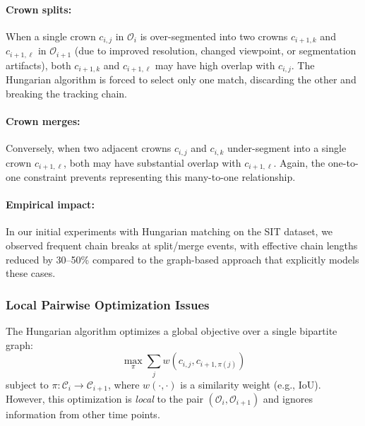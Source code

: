 \paragraph{Crown splits:} When a single crown $c_{i,j}$ in $\mathcal{O}_i$ is over-segmented into two crowns $c_{i+1,k}$ and $c_{i+1,\ell}$ in $\mathcal{O}_{i+1}$ (due to improved resolution, changed viewpoint, or segmentation artifacts), both $c_{i+1,k}$ and $c_{i+1,\ell}$ may have high overlap with $c_{i,j}$. The Hungarian algorithm is forced to select only one match, discarding the other and breaking the tracking chain.

\paragraph{Crown merges:} Conversely, when two adjacent crowns $c_{i,j}$ and $c_{i,k}$ under-segment into a single crown $c_{i+1,\ell}$, both may have substantial overlap with $c_{i+1,\ell}$. Again, the one-to-one constraint prevents representing this many-to-one relationship.

\paragraph{Empirical impact:} In our initial experiments with Hungarian matching on the SIT dataset, we observed frequent chain breaks at split/merge events, with effective chain lengths reduced by 30--50\% compared to the graph-based approach that explicitly models these cases.

\subsubsection{Local Pairwise Optimization Issues}

The Hungarian algorithm optimizes a global objective over a single bipartite graph:
\[
\max_{\pi} \sum_{j} w(c_{i,j}, c_{i+1,\pi(j)})
\]
subject to $\pi : \mathcal{C}_i \to \mathcal{C}_{i+1}$,
where $w(\cdot,\cdot)$ is a similarity weight (e.g., IoU). However, this optimization is \emph{local} to the pair $(\mathcal{O}_i, \mathcal{O}_{i+1})$ and ignores information from other time points.


